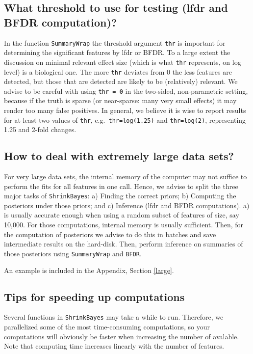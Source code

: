 \documentclass[11pt]{article}
\newcommand{\para}{\bigskip\noindent}
\begin{document}
\subsection{What threshold to use for testing (lfdr and BFDR
computation)?} In the function {\tt SummaryWrap} the threshold
argument {\tt thr} is important for determining the significant
features by lfdr or BFDR. To a large extent the discussion on
minimal relevant effect size (which is what {\tt thr}
represents, on log level) is a biological one. The more {\tt thr}
deviates from 0 the less features are detected, but those that
are detected are likely to be (relatively) relevant. We advise
to be careful with using {\tt thr = 0} in the two-sided,
non-parametric setting, because if the truth is sparse (or
near-sparse: many very small effects) it may render too many
false positives. In general, we believe it is wise to report
results for at least two values of {\tt thr}, e.g.{\tt
thr=log(1.25)} and {\tt thr=log(2)}, representing 1.25 and
2-fold changes.

\subsection{How to deal with extremely large data sets?}
For very large data sets, the internal memory of the computer may not suffice
to perform the fits for all features in one call. Hence, we advise to split
the three major tasks of {\tt ShrinkBayes}: a) Finding the correct priors;  b)
Computing the posteriors under those priors; and c) Inference (lfdr and BFDR computations).
a) is usually accurate enough when using
a random subset of features of size, say 10,000. For those computations, internal memory
is usually sufficient.
Then, for the computation of posteriors we advise to do this in batches and save intermediate results
on the hard-disk. Then, perform inference on summaries of those posteriors using {\tt SummaryWrap} and {\tt BFDR}.

\para
An example is included in the Appendix, Section \ref{large}.

\subsection{Tips for speeding up computations}
Several functions in {\tt ShrinkBayes} may take a while to run.
Therefore, we parallelized some of the most time-consuming computations, so
your computations will obviously be faster when increasing the number of avalable.
Note that computing time increases linearly with the number of features.
\end{document}
